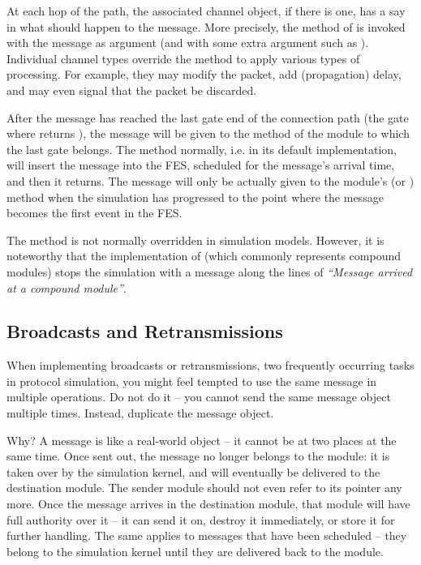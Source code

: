 At each hop of the path, the associated channel object, if there is one, has a
say in what should happen to the message. More precisely, the
 method of  is invoked with the message
as argument (and with some extra argument such as ).
Individual channel types override the  method to apply
various types of processing. For example, they may modify the packet, add
(propagation) delay, and may even signal that the packet be discarded.

After the message has reached the last gate end of the connection path (the gate
where  returns ), the message will be given to
the  method of the module to which the last gate belongs. The
 method normally, i.e. in its default 
implementation, will insert the message into the FES, scheduled for the
message's arrival time, and then it returns. The message will only be actually
given to the module's  (or ) method
when the simulation has progressed to the point where the message becomes the
first event in the FES.

The  method is not normally overridden in simulation models.
However, it is noteworthy that the  implementation of
 (which commonly represents compound modules) stops the
simulation with a message along the lines of \textit{``Message arrived at a compound
module''}.


\subsection{Broadcasts and Retransmissions}
\label{sec:simple-modules:broadcasts-and-retransmissions}

When implementing broadcasts or retransmissions, two frequently
occurring tasks in protocol simulation, you might feel tempted
to use the same message in multiple  operations.
Do not do it -- you cannot send the same message object multiple times.
Instead, duplicate the message object.

Why? A message is like a real-world object -- it cannot be at two places
at the same time. Once sent out, the message no longer belongs
to the module: it is taken over by the simulation kernel, and will
eventually be delivered to the destination module. The sender module should
not even refer to its pointer any more. Once the message arrives in the
destination module, that module will have full authority over it -- it can
send it on, destroy it immediately, or store it for further handling. The
same applies to messages that have been scheduled -- they belong to the
simulation kernel until they are delivered back to the module.

